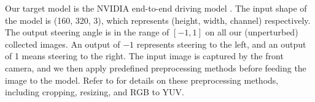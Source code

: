 Our target model is the NVIDIA end-to-end driving model \citep{bojarski2016end}. The input shape of the model is (160, 320, 3), which represents (height, width, channel) respectively. The output steering angle is in the range of $[-1, 1]$ on all our (unperturbed) collected images. An output of $-1$ represents steering to the left, and an output of 1 means steering to the right. The input image is captured by the front camera, and we then apply predefined preprocessing methods before feeding the image to the model. Refer to \citep{bojarski2016end} for details on these preprocessing methods, including cropping, resizing, and RGB to YUV. 



